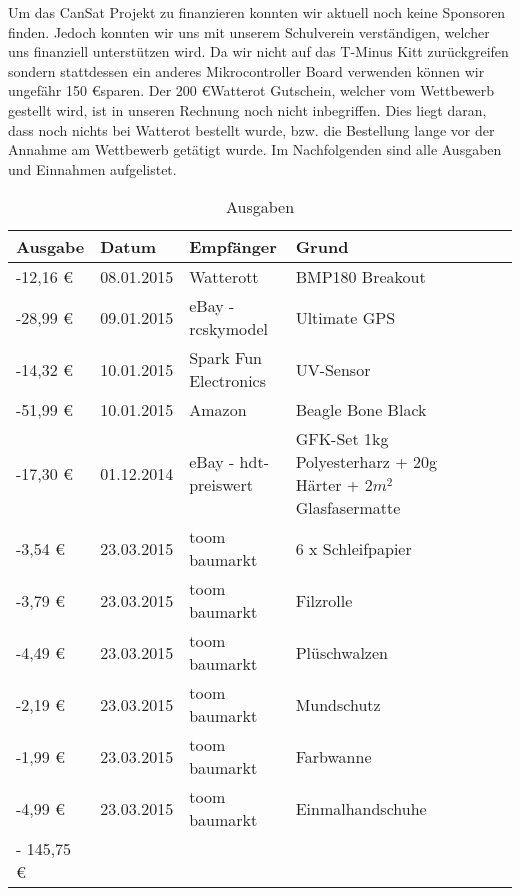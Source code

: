 Um das CanSat Projekt zu finanzieren konnten wir aktuell noch keine Sponsoren finden. Jedoch konnten wir uns mit unserem Schulverein verständigen, welcher uns finanziell unterstützen wird. Da wir nicht auf das T-Minus Kitt zurückgreifen sondern stattdessen ein anderes Mikrocontroller Board verwenden können wir ungefähr 150  \euro  sparen. Der 200 \euro Watterot Gutschein, welcher vom Wettbewerb gestellt wird, ist in unseren Rechnung noch nicht inbegriffen. Dies liegt daran, dass noch nichts bei Watterot bestellt wurde, bzw. die Bestellung lange vor der Annahme am Wettbewerb getätigt wurde.
Im Nachfolgenden sind alle Ausgaben und Einnahmen aufgelistet.
\begin{table}[htbp]
  \centering
    \begin{tabular}{p{}p{}p{}p{}rrrl}
    \toprule
    \textbf{Ausgabe} & \textbf{Datum} & \textbf{Empfänger} & \textbf{Grund} \\
    \midrule
    -12,16 \euro  & 08.01.2015 & Watterott & BMP180 Breakout \\
    -28,99 \euro  & 09.01.2015 & eBay - rcskymodel & Ultimate GPS \\
    -14,32 \euro  & 10.01.2015 & Spark Fun Electronics & UV-Sensor \\
    -51,99 \euro  & 10.01.2015 & Amazon & Beagle Bone Black \\
    -17,30 \euro  & 01.12.2014 & eBay - hdt-preiswert & 
GFK-Set 1kg Polyesterharz + 20g Härter + $2m^2$ Glasfasermatte \\
    -3,54 \euro  & 23.03.2015 & toom baumarkt & 6 x Schleifpapier \\
    -3,79 \euro  & 23.03.2015 & toom baumarkt & Filzrolle \\
    -4,49 \euro  & 23.03.2015 & toom baumarkt & Plüschwalzen \\
    -2,19 \euro  & 23.03.2015 & toom baumarkt & Mundschutz \\
    -1,99 \euro  & 23.03.2015 & toom baumarkt & Farbwanne \\
    -4,99 \euro  & 23.03.2015 & toom baumarkt & Einmalhandschuhe \\
    \bottomrule
    - 145,75 \euro & & & \\
    \bottomrule
    \end{tabular}%
    \caption{Ausgaben}
  \label{tab:budgetausgaben}%
\end{table}%


